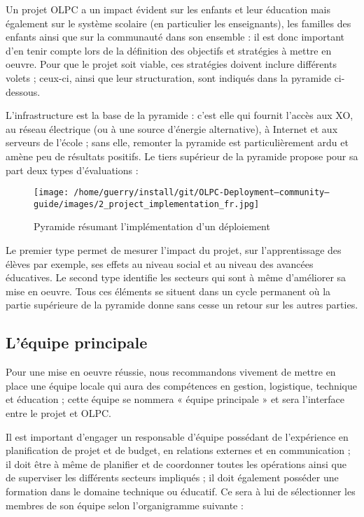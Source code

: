 \documentclass[12pt]{article}
\begin{document}
Un projet OLPC a un impact évident sur les enfants et leur éducation mais
également sur le système scolaire (en particulier les enseignants), les
familles des enfants ainsi que sur la communauté dans son ensemble : il est
donc important d'en tenir compte lors de la définition des objectifs et
stratégies à mettre en oeuvre. Pour que le projet soit viable, ces
stratégies doivent inclure différents volets ; ceux-ci, ainsi que leur
structuration, sont indiqués dans la pyramide ci-dessous.

L'infrastructure est la base de la pyramide : c'est elle qui fournit
l'accès aux XO, au réseau électrique (ou à une source d'énergie
alternative), à Internet et aux serveurs de l'école ; sans elle, remonter
la pyramide est particulièrement ardu et amène peu de résultats
positifs. Le tiers supérieur de la pyramide propose pour sa part deux types
d'évaluations :

\begin{figure}[htb]
\centering
\texttt{[image: /home/guerry/install/git/OLPC-Deployment--community--guide/images/2\_project\_implementation\_fr.jpg]}
\caption{Pyramide résumant l'implémentation d'un déploiement}
\end{figure}

Le premier type permet de mesurer l'impact du projet, sur l'apprentissage
des élèves par exemple, ses effets au niveau social et au niveau des
avancées éducatives. Le second type identifie les secteurs qui sont à même
d'améliorer sa mise en oeuvre. Tous ces éléments se situent dans un cycle
permanent où la partie supérieure de la pyramide donne sans cesse un retour
sur les autres parties.
\subsection{L'équipe principale}
\label{sec-4-1}



Pour une mise en oeuvre réussie, nous recommandons vivement de mettre en
place une équipe locale qui aura des compétences en gestion, logistique,
technique et éducation ; cette équipe se nommera « équipe principale » et
sera l'interface entre le projet et OLPC.

Il est important d'engager un responsable d'équipe possédant de
l'expérience en planification de projet et de budget, en relations externes
et en communication ; il doit être à même de planifier et de coordonner
toutes les opérations ainsi que de superviser les différents secteurs
impliqués ; il doit également posséder une formation dans le domaine
technique ou éducatif. Ce sera à lui de sélectionner les membres de son
équipe selon l'organigramme suivante :
\end{document}
